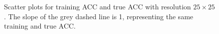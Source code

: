 \documentclass[12pt]{article}
\begin{document}
		\begin{figure}[htpb]
			\centering
			\caption{Scatter plots for training ACC and true ACC with resolution $25\times 25$. The slope of the grey dashed line is 1, representing the same training and true ACC.}
			\label{fig:acc_scatter_resolution_25}
		\end{figure}
\end{document}
